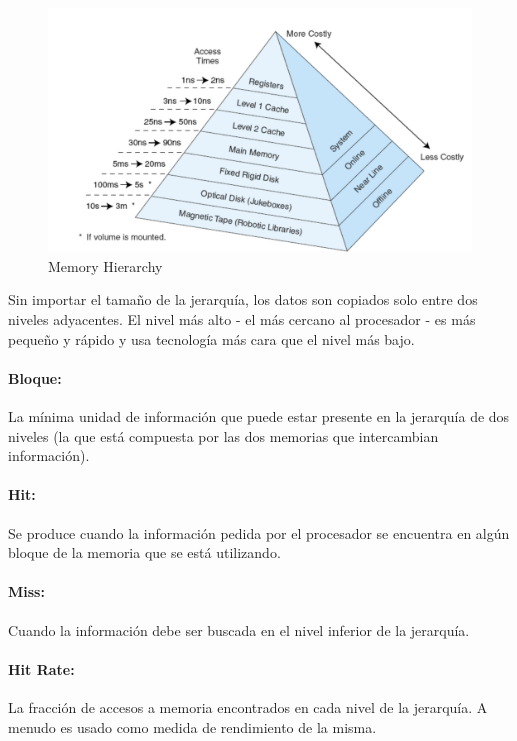 \begin{figure}[ht]
	\centering
	\includegraphics[width=1\textwidth]{imagenes/memory-heriarchy}
	\caption{Memory Hierarchy}
	\label{fig:memory-hierarchy}
\end{figure}

Sin importar el tamaño de la jerarquía, los datos son copiados solo entre dos niveles adyacentes. El nivel más alto - el más cercano al procesador - es más pequeño y rápido y usa tecnología más cara que el nivel más bajo.

\paragraph{Bloque:} La mínima unidad de información que puede estar presente en la jerarquía de dos niveles (la que está compuesta por las dos memorias que intercambian información).

\paragraph{Hit:} Se produce cuando la información pedida por el procesador se encuentra en algún bloque de la memoria que se está utilizando.

\paragraph{Miss:} Cuando la información debe ser buscada en el nivel inferior de la jerarquía.

\paragraph{Hit Rate:} La fracción de accesos a memoria encontrados en cada nivel de la jerarquía. A menudo es usado como medida de rendimiento de la misma.

